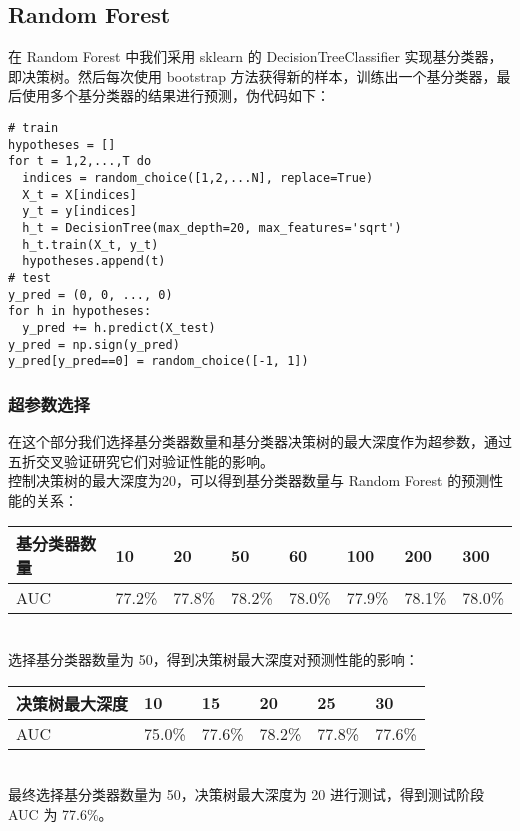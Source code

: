 \documentclass{article}
\begin{document}
\subsection{Random Forest}
在 Random Forest 中我们采用 sklearn 的 DecisionTreeClassifier 实现基分类器，即决策树。然后每次使用 bootstrap 方法获得新的样本，训练出一个基分类器，最后使用多个基分类器的结果进行预测，伪代码如下：\\
\begin{lstlisting}[frame=bt,numbers=none]
# train
hypotheses = []
for t = 1,2,...,T do
  indices = random_choice([1,2,...N], replace=True)
  X_t = X[indices]
  y_t = y[indices]
  h_t = DecisionTree(max_depth=20, max_features='sqrt')
  h_t.train(X_t, y_t)
  hypotheses.append(t)
# test
y_pred = (0, 0, ..., 0)
for h in hypotheses:
  y_pred += h.predict(X_test)
y_pred = np.sign(y_pred)
y_pred[y_pred==0] = random_choice([-1, 1])
\end{lstlisting}

\subsubsection*{超参数选择}
在这个部分我们选择基分类器数量和基分类器决策树的最大深度作为超参数，通过五折交叉验证研究它们对验证性能的影响。\\
控制决策树的最大深度为20，可以得到基分类器数量与 Random Forest 的预测性能的关系：\\
\begin{table}[!htbp]
	\begin{tabular}{|l|l|l|l|l|l|l|l|}
		\hline
		基分类器数量 & 10     & 20     & 50     & 60     & 100    & 200    & 300    \\ \hline
		AUC    & 77.2\% & 77.8\% & 78.2\% & 78.0\% & 77.9\% & 78.1\% & 78.0\% \\ \hline
	\end{tabular}
\end{table}\\
选择基分类器数量为 50，得到决策树最大深度对预测性能的影响：\\
\begin{table}[!htbp]
	\begin{tabular}{|l|l|l|l|l|l|}
		\hline
		决策树最大深度 & 10     & 15     & 20     & 25     & 30     \\ \hline
		AUC     & 75.0\% & 77.6\% & 78.2\% & 77.8\% & 77.6\% \\ \hline
	\end{tabular}
\end{table}\\
最终选择基分类器数量为 50，决策树最大深度为 20 进行测试，得到测试阶段 AUC 为 77.6\%。
\end{document}

